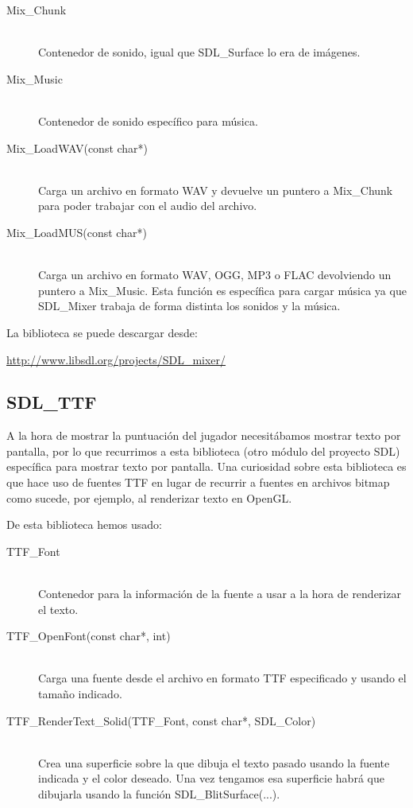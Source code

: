 \documentclass[parskip=half*]{scrartcl}
\begin{document}
	\begin{description}
		\item[Mix\_Chunk] \hfill \\	Contenedor de sonido, igual que SDL\_Surface lo era de im\'agenes.

		\item[Mix\_Music] \hfill \\ Contenedor de sonido espec\'ifico para m\'usica.

		\item[Mix\_LoadWAV(const char*)] \hfill \\	Carga un archivo en formato WAV y devuelve un puntero a Mix\_Chunk para poder trabajar con el audio del archivo.

		\item[Mix\_LoadMUS(const char*)] \hfill \\	Carga un archivo en formato WAV, OGG, MP3 o FLAC devolviendo un puntero a Mix\_Music. Esta funci\'on es espec\'ifica para cargar m\'usica ya que SDL\_Mixer trabaja de forma distinta los sonidos y la m\'usica.
	\end{description}

	La biblioteca se puede descargar desde: \\

	\centerline{\url{http://www.libsdl.org/projects/SDL_mixer/}}

	\subsection{SDL\_TTF}
	A la hora de mostrar la puntuaci\'on del jugador necesit\'abamos mostrar texto por pantalla, por lo que recurrimos a esta biblioteca (otro m\'odulo del proyecto SDL) espec\'ifica para mostrar texto por pantalla. Una curiosidad sobre esta biblioteca es que hace uso de fuentes TTF en lugar de recurrir a fuentes en archivos bitmap como sucede, por ejemplo, al renderizar texto en OpenGL.

	De esta biblioteca hemos usado:

	\begin{description}
		\item[TTF\_Font] \hfill \\	Contenedor para la informaci\'on de la fuente a usar a la hora de renderizar el texto.

		\item[TTF\_OpenFont(const char*, int)] \hfill \\ Carga una fuente desde el archivo en formato TTF especificado y usando el tamaño indicado.

		\item[TTF\_RenderText\_Solid(TTF\_Font, const char*, SDL\_Color)] \hfill \\ Crea una superficie sobre la que dibuja el texto pasado usando la fuente indicada y el color deseado. Una vez tengamos esa superficie habr\'a que dibujarla usando la funci\'on SDL\_BlitSurface(...). 
	\end{description}
\end{document}
